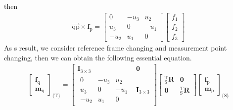 then
\begin{equation}
\begin{split}
\overrightarrow{\mathrm{q}\mathrm{p}}\times \boldsymbol{f}_\mathrm{p}
=
\begin{bmatrix}
0		&-u_3		&u_2		\\
u_3		&0			&-u_1		\\
-u_2	&u_1		&0		
\end{bmatrix}
\begin{bmatrix}
f_1\\
f_2\\
f_3
\end{bmatrix}
\end{split}
\end{equation}
As s result, we consider reference frame changing and measurement point changing, then we can obtain the following essential equation.
\begin{equation}
\begin{split}
\begin{bmatrix}
\boldsymbol{f}_\mathrm{q}\\ 
\boldsymbol{m}_\mathrm{q}
\end{bmatrix}
_{\{ \mathrm{T}\}}
=
\begin{bmatrix}
\mathbf{I}_{3 \times 3} & \boldsymbol{0}\\ 
\begin{matrix}
0		&-u_3		&u_2		\\
u_3		&0			&-u_1		\\
-u_2	&u_1		&0		
\end{matrix} & \mathbf{I}_{3 \times 3}
\end{bmatrix}
\begin{bmatrix}
_\mathrm{S}^\mathrm{T}\mathbf{R} & \boldsymbol{0}\\ 
\boldsymbol{0} & _\mathrm{S}^\mathrm{T}\mathbf{R}
\end{bmatrix}
\begin{bmatrix}
\boldsymbol{f}_\mathrm{p}\\ 
\boldsymbol{m}_\mathrm{p}
\end{bmatrix}
_{\{ \mathrm{S}\}}
\end{split}
\end{equation}
